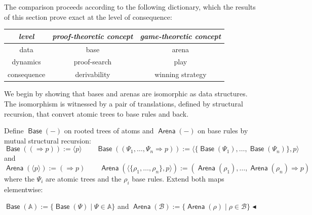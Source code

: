 \documentclass{lipics-v2021}
\newcommand{\fillBox}{\hfill$\blacktriangleleft$}
\newcommand{\base}[1]{\mathcal{#1}}                    %
\newcommand{\arena}[1]{\mathbb{#1}}                     %
\newcommand{\atree}[2]{#1 \Rightarrow #2}              %
\newcommand{\tobase}[1]{\mathrel{\textsf{Base}}(#1)}            %
\newcommand{\toarena}[1]{\mathrel{\textsf{Arena}}(#1)}           %
\begin{document}
The comparison proceeds according
to the following dictionary, which the results of this section prove exact
at the level of consequence:
\begin{center}
\begin{tabular}{c|cc}
    \emph{level} & \emph{proof-theoretic concept} & \emph{game-theoretic concept} \\[1mm] \hline
    data & base & arena \\
    dynamics & proof-search & play \\
    consequence & derivability & winning strategy
\end{tabular}
\end{center}
 
We begin by showing that bases and arenas are
isomorphic as data structures. The isomorphism is witnessed by a pair of
translations, defined by structural recursion, that convert atomic trees to
base rules and back.
\begin{definition}[Translations]
\label{def:arena-rule-function}
Define $\tobase{-}$ on rooted trees of atoms and $\toarena{-}$ on base rules by mutual
structural recursion:
\[
  \tobase{(\atree{}{p})} := \langle p \rangle \qquad   \tobase{(\atree{\Psi_1, \ldots, \Psi_n}{p})} :=
      \langle \{\tobase{\Psi_1}, \ldots, \tobase{\Psi_n}\}, p \rangle
\]
and
\[
  \toarena{\langle p \rangle} := (\atree{}{p}) \qquad \toarena{\langle \{\rho_1, \ldots, \rho_n\}, p \rangle} :=
      (\atree{\toarena{\rho_1}, \ldots, \toarena{\rho_n}}{p})
\]
where the $\Psi_i$ are atomic trees and the $\rho_i$ base rules. Extend both maps
elementwise: 
\begin{center}
\hspace{10mm}$\tobase{\arena{A}} := \{ \tobase{\Psi} \mid \Psi \in \arena{A} \}$ \quad and \quad
$\toarena{\base{B}} := \{ \toarena{\rho} \mid \rho \in \base{B} \}$ \fillBox
\end{center} 

\end{definition}
 
\end{document}
